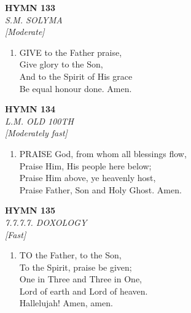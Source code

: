 \documentclass[11pt,a4paper]{article}
\begin{document}
\newpage
\begin{center}
    {\Large \textbf{HYMN 133}}
    \\
    \textit{S.M. SOLYMA}
    \\
    \textit{\small [Moderate]}
\end{center}
\vspace{1em}

\begin{enumerate}
    \item GIVE to the Father praise, \\
        Give glory to the Son, \\
        And to the Spirit of His grace \\
        Be equal honour done. Amen.

\end{enumerate}

\newpage
\begin{center}
    {\Large \textbf{HYMN 134}}
    \\
    \textit{L.M. OLD 100TH}
    \\
    \textit{\small [Moderately fast]}
\end{center}
\vspace{1em}

\begin{enumerate}
    \item PRAISE God, from whom all blessings flow, \\
        Praise Him, His people here below; \\
        Praise Him above, ye heavenly host, \\
        Praise Father, Son and Holy Ghost. Amen.

\end{enumerate}

\newpage
\begin{center}
    {\Large \textbf{HYMN 135}}
    \\
    \textit{7.7.7.7. DOXOLOGY}
    \\
    \textit{\small [Fast]}
\end{center}
\vspace{1em}

\begin{enumerate}
    \item TO the Father, to the Son, \\
        To the Spirit, praise be given; \\
        One in Three and Three in One, \\
        Lord of earth and Lord of heaven. \\
        Hallelujah! Amen, amen.

\end{enumerate}
\end{document}

